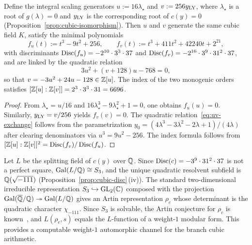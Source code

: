 \begin{proposition}\label{prop:scaling-exchange}
Define the integral scaling generators $u:=16\lambda_\star$ and $v:=256y_{\mathrm{LY}}$, where $\lambda_\star$ is a root of $g(\lambda)=0$ and $y_{\mathrm{LY}}$ is the corresponding root of $c(y)=0$ (Proposition~\ref{prop:cubic-isomorphism}).
Then $u$ and $v$ generate the same cubic field $K$, satisfy the minimal polynomials
\[
f_u(t):=t^3-9t^2+256,\qquad f_v(t):=t^3+411t^2+42240t+2^{21},
\]
with discriminants $\operatorname{Disc}(f_u)=-2^{10}\cdot 3^3\cdot 37$ and $\operatorname{Disc}(f_v)=-2^{16}\cdot 3^9\cdot 31^2\cdot 37$, and are linked by the quadratic relation
\begin{equation}\label{eq:uv-exchange}
3u^2+(v+128)u-768=0,
\end{equation}
so that $v=-3u^2+24u-128\in\mathbb{Z}[u]$.
The index of the two monogenic orders satisfies $[\mathbb{Z}[u]:\mathbb{Z}[v]]=2^3\cdot 3^3\cdot 31=6696$.
\end{proposition}

\begin{proof}
From $\lambda_\star=u/16$ and $16\lambda_\star^3-9\lambda_\star^2+1=0$, one obtains $f_u(u)=0$.
Similarly, $y_{\mathrm{LY}}=v/256$ yields $f_v(v)=0$.
The quadratic relation~\eqref{eq:uv-exchange} follows from the parametrization $y_0=(4\lambda^3-3\lambda^2-2\lambda+1)/(4\lambda)$ after clearing denominators via $u^3=9u^2-256$.
The index formula follows from $[\mathbb{Z}[u]:\mathbb{Z}[v]]^2=\operatorname{Disc}(f_v)/\operatorname{Disc}(f_u)$.
\end{proof}

\begin{remark}\label{rmk:artin-weight1}
Let $L$ be the splitting field of $c(y)$ over $\mathbb{Q}$.
Since $\operatorname{Disc}(c)=-3^9\cdot 31^2\cdot 37$ is not a perfect square, $\mathrm{Gal}(L/\mathbb{Q})\cong S_3$, and the unique quadratic resolvent subfield is $\mathbb{Q}(\sqrt{-111})$ (Proposition~\ref{prop:cubic-disc}\,(iv)).
The standard two-dimensional irreducible representation $S_3\hookrightarrow\mathrm{GL}_2(\mathbb{C})$ composed with the projection $\mathrm{Gal}(\overline{\mathbb{Q}}/\mathbb{Q})\twoheadrightarrow\mathrm{Gal}(L/\mathbb{Q})$ gives an Artin representation $\rho_{c}$ whose determinant is the quadratic character $\chi_{-111}$.
Since $S_3$ is solvable, the Artin conjecture for $\rho_{c}$ is known~\cite{DeligneSerre1974WeightOne}, and $L(\rho_{c},s)$ equals the $L$-function of a weight-$1$ modular form.
This provides a computable weight-$1$ automorphic channel for the branch cubic arithmetic.
\end{remark}

